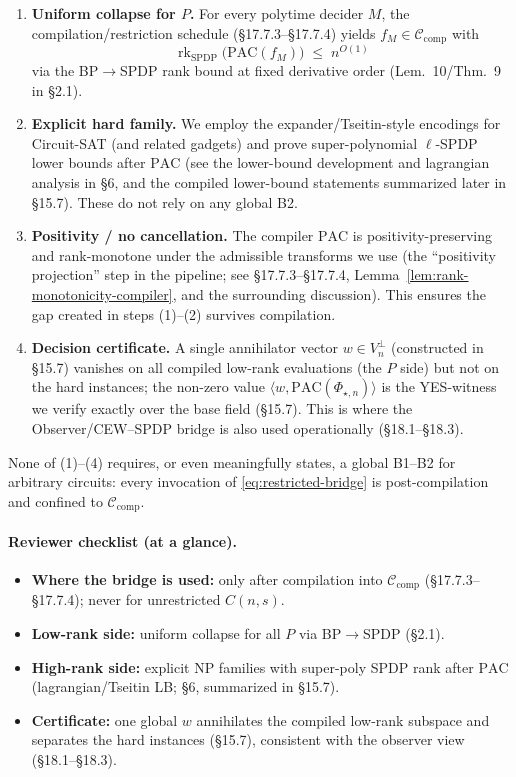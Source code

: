 \documentclass[12pt]{article}
\theoremstyle{definition}
\theoremstyle{definition}
\theoremstyle{remark}
\theoremstyle{remark}
\begin{document}
\begin{enumerate}
\item \textbf{Uniform collapse for $P$.} For every polytime decider $M$, the compilation/restriction schedule (\S17.7.3--\S17.7.4) yields $f_M \in \mathcal{C}_{\mathrm{comp}}$ with
\[
\operatorname{rk}_{\mathrm{SPDP}}\!\bigl(\mathrm{PAC}(f_M)\bigr) \;\le\; n^{O(1)}
\]
via the BP$\to$SPDP rank bound at fixed derivative order (Lem.~10/Thm.~9 in \S2.1).

\item \textbf{Explicit hard family.} We employ the expander/Tseitin-style encodings for Circuit-SAT (and related gadgets) and prove super-polynomial $\ell$-SPDP lower bounds after $\mathrm{PAC}$ (see the lower-bound development and lagrangian analysis in \S6, and the compiled lower-bound statements summarized later in \S15.7). These do not rely on any global B2.

\item \textbf{Positivity / no cancellation.} The compiler $\mathrm{PAC}$ is positivity-preserving and rank-monotone under the admissible transforms we use (the ``positivity projection'' step in the pipeline; see \S17.7.3--\S17.7.4, Lemma~\ref{lem:rank-monotonicity-compiler}, and the surrounding discussion). This ensures the gap created in steps (1)--(2) survives compilation.

\item \textbf{Decision certificate.} A single annihilator vector $w \in V_n^\perp$ (constructed in \S15.7) vanishes on all compiled low-rank evaluations (the $P$ side) but not on the hard instances; the non-zero value $\langle w, \mathrm{PAC}(\Phi_{\star,n})\rangle$ is the YES-witness we verify exactly over the base field (\S15.7). This is where the Observer/CEW--SPDP bridge is also used operationally (\S18.1--\S18.3).
\end{enumerate}

None of (1)--(4) requires, or even meaningfully states, a global B1--B2 for arbitrary circuits: every invocation of \eqref{eq:restricted-bridge} is post-compilation and confined to $\mathcal{C}_{\mathrm{comp}}$.

\paragraph{Reviewer checklist (at a glance).}

\begin{itemize}
\item \textbf{Where the bridge is used:} only after compilation into $\mathcal{C}_{\mathrm{comp}}$ (\S17.7.3--\S17.7.4); never for unrestricted $C(n,s)$.
\item \textbf{Low-rank side:} uniform collapse for all $P$ via BP$\to$SPDP (\S2.1).
\item \textbf{High-rank side:} explicit NP families with super-poly SPDP rank after $\mathrm{PAC}$ (lagrangian/Tseitin LB; \S6, summarized in \S15.7).
\item \textbf{Certificate:} one global $w$ annihilates the compiled low-rank subspace and separates the hard instances (\S15.7), consistent with the observer view (\S18.1--\S18.3).
\end{itemize}
\end{document}
